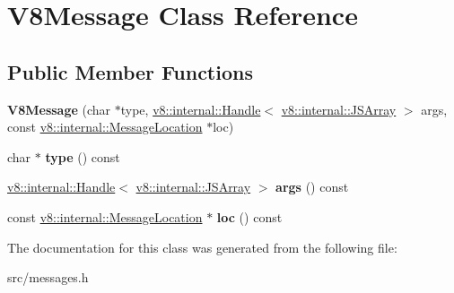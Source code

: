 \hypertarget{class_v8_message}{}\section{V8\+Message Class Reference}
\label{class_v8_message}
\subsection*{Public Member Functions}
\begin{DoxyCompactItemize}
\item 
\hypertarget{class_v8_message_a3786336b179ae2dd633ab826215351ba}{}{\bfseries V8\+Message} (char $\ast$type, \hyperlink{classv8_1_1internal_1_1_handle}{v8\+::internal\+::\+Handle}$<$ \hyperlink{classv8_1_1internal_1_1_j_s_array}{v8\+::internal\+::\+J\+S\+Array} $>$ args, const \hyperlink{classv8_1_1internal_1_1_message_location}{v8\+::internal\+::\+Message\+Location} $\ast$loc)\label{class_v8_message_a3786336b179ae2dd633ab826215351ba}

\item 
\hypertarget{class_v8_message_a9b46b4296b48b0dc783ee7999cf17db0}{}char $\ast$ {\bfseries type} () const \label{class_v8_message_a9b46b4296b48b0dc783ee7999cf17db0}

\item 
\hypertarget{class_v8_message_a5e6e65f81e4d28011331238805fefece}{}\hyperlink{classv8_1_1internal_1_1_handle}{v8\+::internal\+::\+Handle}$<$ \hyperlink{classv8_1_1internal_1_1_j_s_array}{v8\+::internal\+::\+J\+S\+Array} $>$ {\bfseries args} () const \label{class_v8_message_a5e6e65f81e4d28011331238805fefece}

\item 
\hypertarget{class_v8_message_a160acc937c151f472d2e689d05c04ea2}{}const \hyperlink{classv8_1_1internal_1_1_message_location}{v8\+::internal\+::\+Message\+Location} $\ast$ {\bfseries loc} () const \label{class_v8_message_a160acc937c151f472d2e689d05c04ea2}

\end{DoxyCompactItemize}


The documentation for this class was generated from the following file\+:\begin{DoxyCompactItemize}
\item 
src/messages.\+h\end{DoxyCompactItemize}

